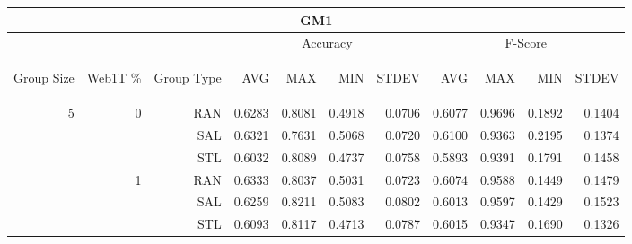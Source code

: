 \begin{center}
\begin{table}[htbp] 
 \begin{center}
\begin{tabular}{ | r | r | r | r | r | r | r | r | r | r | r |}
\hline
\multicolumn{11}{|c|}{GM1}\\
\hline
 & & & \multicolumn{4}{|c|}{Accuracy} & \multicolumn{4}{|c|}{F-Score}\\ \cline{4-11}
\begin{sideways}Group Size\end{sideways} & \begin{sideways}Web1T \%\end{sideways} & \begin{sideways}Group Type\end{sideways} & \begin{sideways}AVG\end{sideways} & \begin{sideways}MAX\end{sideways} & \begin{sideways}MIN\end{sideways} & \begin{sideways}STDEV\end{sideways} & \begin{sideways}AVG\end{sideways} & \begin{sideways}MAX\end{sideways} & \begin{sideways}MIN\end{sideways} & \begin{sideways}STDEV\end{sideways}\\
\hline
\multirow{18}{*}{5}
 & \multirow{3}{*}{0} & RAN & 0.6283 & 0.8081 & 0.4918 & 0.0706 & 0.6077 & 0.9696 & 0.1892 & 0.1404\\ \cline{3-11}
 &   & SAL & 0.6321 & 0.7631 & 0.5068 & 0.0720 & 0.6100 & 0.9363 & 0.2195 & 0.1374\\ \cline{3-11}
 &   & STL & 0.6032 & 0.8089 & 0.4737 & 0.0758 & 0.5893 & 0.9391 & 0.1791 & 0.1458\\ \cline{2-11}
 & \multirow{3}{*}{1} & RAN & 0.6333 & 0.8037 & 0.5031 & 0.0723 & 0.6074 & 0.9588 & 0.1449 & 0.1479\\ \cline{3-11}
 &   & SAL & 0.6259 & 0.8211 & 0.5083 & 0.0802 & 0.6013 & 0.9597 & 0.1429 & 0.1523\\ \cline{3-11}
 &   & STL & 0.6093 & 0.8117 & 0.4713 & 0.0787 & 0.6015 & 0.9347 & 0.1690 & 0.1326\\ \cline{2-11}

\end{tabular}
\end{center}
\end{table}
\end{center}
